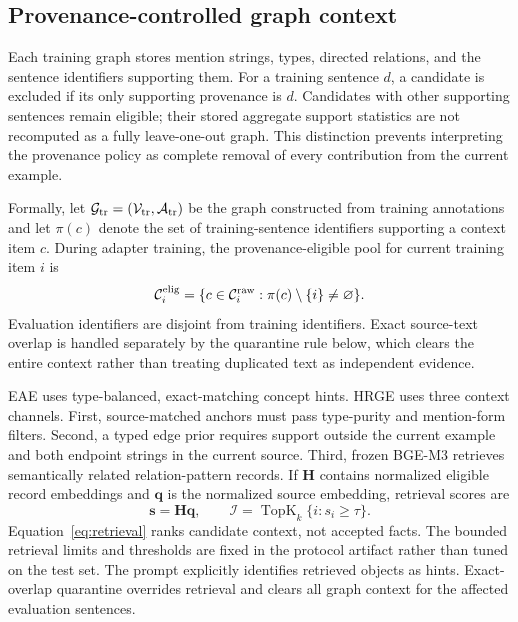 \documentclass[a4paper,fleqn,numbers,doubleblind]{cas-dc}
\begin{document}
\subsection{Provenance-controlled graph context}
Each training graph stores mention strings, types, directed relations, and
the sentence identifiers supporting them. For a training sentence $d$, a
candidate is excluded if its only supporting provenance is $d$. Candidates
with other supporting sentences remain eligible; their stored aggregate
support statistics are not recomputed as a fully leave-one-out graph. This
distinction prevents interpreting the provenance policy as complete removal
of every contribution from the current example.

Formally, let $\mathcal G_{\rm tr}=(\mathcal V_{\rm tr},\mathcal A_{\rm tr})$
be the graph constructed from training annotations and let $\pi(c)$ denote the
set of training-sentence identifiers supporting a context item $c$. During
adapter training, the provenance-eligible pool for current training item $i$ is
\begin{equation}
\mathcal C_i^{\rm elig}
=\{c\in\mathcal C_i^{\rm raw}:\pi(c)\setminus\{i\}\neq\varnothing\}.
\label{eq:provenance-eligible}
\end{equation}
Evaluation identifiers are disjoint from training identifiers. Exact source-text
overlap is handled separately by the quarantine rule below, which clears the
entire context rather than treating duplicated text as independent evidence.

EAE uses type-balanced, exact-matching concept hints. HRGE uses three context
channels. First, source-matched anchors must pass type-purity and mention-form
filters. Second, a typed edge prior requires support outside the current
example and both endpoint strings in the current source. Third,
frozen BGE-M3 retrieves semantically related relation-pattern records. If
$\mathbf{H}$ contains normalized eligible record embeddings and
$\mathbf{q}$ is the normalized source embedding, retrieval scores are
\begin{equation}
\mathbf{s}=\mathbf{H}\mathbf{q},\qquad
\mathcal I=\operatorname{TopK}_{k}\{i:s_i\geq\tau\}.
\label{eq:retrieval}
\end{equation}
Equation~\eqref{eq:retrieval} ranks candidate context, not accepted facts.
The bounded retrieval limits and thresholds are fixed in the protocol artifact
rather than tuned on the test set. The prompt explicitly identifies retrieved
objects as hints. Exact-overlap
quarantine overrides retrieval and clears all graph context for the affected
evaluation sentences.
\end{document}

